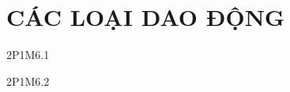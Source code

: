 \documentclass[
tuychon=HS1,
pagesize=BookA4,%
company=MAP, %
mausac = 01,
]{Class/MAPClass}
\begin{document}
\section{CÁC LOẠI DAO ĐỘNG}

\begin{cauhoiTN}{2P1M6.1}

\end{cauhoiTN}
%
\setcounter{vidu}{0}

\Btvandung
\begin{cauhoiTN}{2P1M6.2}

\end{cauhoiTN}
%
%
\end{document}
